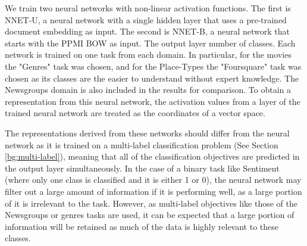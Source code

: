 We train two neural networks with non-linear activation functions. The first is NNET-U, a neural network with a single hidden layer that uses a pre-trained document embedding as input. The second is NNET-B, a neural network that starts with the PPMI BOW as input. The output layer  number of classes. Each network is trained on one task from each domain.  In particular, for the movies the "Genres" task was chosen, and for the Place-Types the "Foursquare" task was chosen as its classes are the easier to understand without expert knowledge. The Newsgroups domain is also included in the results for comparison. To obtain a representation from this neural network, the activation values from a layer of the trained neural network are treated as the coordinates of a vector space.

The representations derived from these networks should differ from the  neural network as it is trained on a multi-label classification problem (See Section \ref{bg:multi-label}), meaning that all of the classification objectives are predicted in the output layer simultaneously. In the case of a binary task like Sentiment (where only one class is classified and it is either 1 or 0),  the neural network may filter out a large amount of information if it is performing well, as a large portion of it is irrelevant to the task. However, as multi-label objectives like those of the Newsgroups or genres tasks are used, it can be expected that a large portion of information will be retained as much of the data is highly relevant to these classes. 


